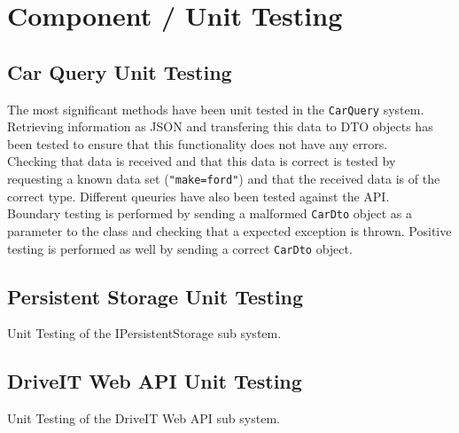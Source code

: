 \section{Component / Unit Testing}
\subsection{Car Query Unit Testing}
The most significant methods have been unit tested in the \texttt{CarQuery} system.\\
Retrieving information as JSON and transfering this data to DTO objects has been tested to ensure that this functionality does not have any errors.\\
Checking that data is received and that this data is correct is tested by requesting a known data set (\texttt{"make=ford"}) and that the received data is of the correct type. Different queuries have also been tested against the API.\\ 
Boundary testing is performed by sending a malformed \texttt{CarDto} object as a parameter to the class and checking that a expected exception is thrown. Positive testing is performed as well by sending a correct \texttt{CarDto} object.

\subsection{Persistent Storage Unit Testing}
Unit Testing of the IPersistentStorage sub system.

\subsection{DriveIT Web API Unit Testing}
Unit Testing of the DriveIT Web API sub system.